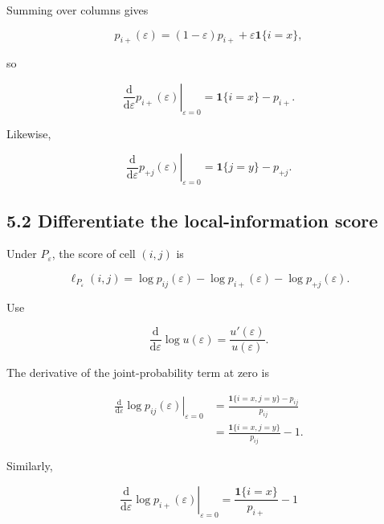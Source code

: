 \documentclass[
  11pt]{article}
\begin{document}
Summing over columns gives

\begin{equation}
p_{i+}(\varepsilon)
=(1-\varepsilon)p_{i+}
+\varepsilon\mathbf 1\{i=x\},
\end{equation}

so

\begin{equation}
\left.
\frac{\mathrm d}{\mathrm d\varepsilon}p_{i+}(\varepsilon)
\right|_{\varepsilon=0}
=\mathbf 1\{i=x\}-p_{i+}.
\end{equation}

Likewise,

\begin{equation}
\left.
\frac{\mathrm d}{\mathrm d\varepsilon}p_{+j}(\varepsilon)
\right|_{\varepsilon=0}
=\mathbf 1\{j=y\}-p_{+j}.
\end{equation}

\subsection{5.2 Differentiate the local-information
score}\label{differentiate-the-local-information-score}

Under \(P_\varepsilon\), the score of cell \((i,j)\) is

\begin{equation}
\ell_{P_\varepsilon}(i,j)
=\log p_{ij}(\varepsilon)
-\log p_{i+}(\varepsilon)
-\log p_{+j}(\varepsilon).
\end{equation}

Use

\begin{equation}
\frac{\mathrm d}{\mathrm d\varepsilon}\log u(\varepsilon)
=\frac{u'(\varepsilon)}{u(\varepsilon)}.
\end{equation}

The derivative of the joint-probability term at zero is

\begin{equation}
\begin{aligned}
\left.
\frac{\mathrm d}{\mathrm d\varepsilon}\log p_{ij}(\varepsilon)
\right|_{\varepsilon=0}
&=\frac{\mathbf 1\{i=x,j=y\}-p_{ij}}{p_{ij}}\\
&=\frac{\mathbf 1\{i=x,j=y\}}{p_{ij}}-1.
\end{aligned}
\end{equation}

Similarly,

\begin{equation}
\left.
\frac{\mathrm d}{\mathrm d\varepsilon}\log p_{i+}(\varepsilon)
\right|_{\varepsilon=0}
=\frac{\mathbf 1\{i=x\}}{p_{i+}}-1
\end{equation}
\end{document}
